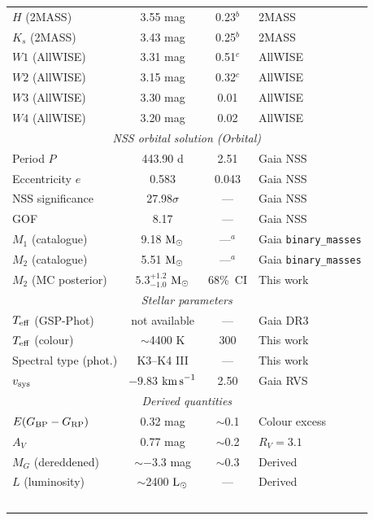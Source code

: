 \documentclass[usenatbib,fleqn]{mnras}
\newcommand{\Msun}{{\rm M}_\odot}
\newcommand{\Lsun}{{\rm L}_\odot}
\newcommand{\kms}{{\rm km\,s}^{-1}}
\begin{document}
\begin{table}
\begin{tabular}{lccl}
$H$ (2MASS)            & 3.55 mag             & 0.23$^b$ & 2MASS \\
$K_s$ (2MASS)          & 3.43 mag             & 0.25$^b$ & 2MASS \\
$W1$ (AllWISE)         & 3.31 mag             & 0.51$^c$ & AllWISE \\
$W2$ (AllWISE)         & 3.15 mag             & 0.32$^c$ & AllWISE \\
$W3$ (AllWISE)         & 3.30 mag             & 0.01     & AllWISE \\
$W4$ (AllWISE)         & 3.20 mag             & 0.02     & AllWISE \\
\midrule
\multicolumn{4}{c}{\textit{NSS orbital solution (Orbital)}} \\
Period $P$             & 443.90 d             & 2.51     & Gaia NSS \\
Eccentricity $e$       & 0.583                & 0.043    & Gaia NSS \\
NSS significance       & 27.98$\sigma$        & ---      & Gaia NSS \\
GOF                    & 8.17                 & ---      & Gaia NSS \\
$M_1$ (catalogue)      & 9.18 $\Msun$         & ---$^a$  & Gaia \texttt{binary\_masses} \\
$M_2$ (catalogue)      & 5.51 $\Msun$         & ---$^a$  & Gaia \texttt{binary\_masses} \\
$M_2$ (MC posterior)   & $5.3^{+1.2}_{-1.0}$ $\Msun$ & 68\%~CI & This work \\
\midrule
\multicolumn{4}{c}{\textit{Stellar parameters}} \\
$T_{\rm eff}$ (GSP-Phot)   & not available    & ---      & Gaia DR3 \\
$T_{\rm eff}$ (colour)     & $\sim$4400 K     & 300      & This work \\
Spectral type (phot.)      & K3--K4 III       & ---      & This work \\
$v_{\rm sys}$              & $-9.83$ $\kms$   & 2.50     & Gaia RVS \\
\midrule
\multicolumn{4}{c}{\textit{Derived quantities}} \\
$E(G_{\rm BP} - G_{\rm RP})$ & 0.32 mag       & $\sim$0.1 & Colour excess \\
$A_V$                  & 0.77 mag             & $\sim$0.2 & $R_V = 3.1$ \\
$M_G$ (dereddened)     & $\sim$$-3.3$ mag     & $\sim$0.3 & Derived \\
$L$ (luminosity)       & $\sim$2400 $\Lsun$   & ---      & Derived \\
$$
\end{tabular}
\end{table}
\end{document}

